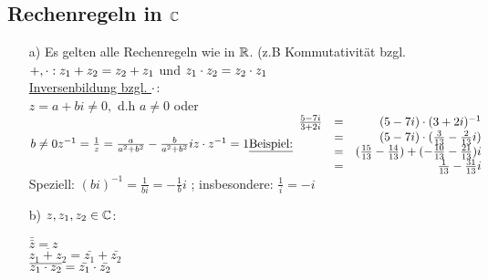 \subsection{Rechenregeln in $\mathbb{C}$}
\begin{enumerate}
\item[a)]Es gelten alle Rechenregeln wie in $\mathbb{R}$. (z.B Kommutativit\"at bzgl. $+,\cdot:z_1 + z_2 = z_2 + z_1$ und $z_1 \cdot z_2 = z_2 \cdot z_1$\\
\underline{Inversenbildung bzgl. $\cdot$}:\\
$z = a+bi \not = 0,$ d.h $a \not = 0$ oder $b \not = 0\\
z^{-1} = \frac{1}{z} = \frac{a}{a^2 + b^2} - \frac{b}{a^2+b^2}i\\
z \cdot z^{-1} = 1\\
\text{\underline{Beispiel:}}
\begin{array}{lcr}
\frac{5-7i}{3+2i} &=& (5-7i) \cdot (3+2i)^{-1}\\
&=& (5-7i) \cdot (\frac{3}{13} -\frac{2}{13}i)\\
&=& (\frac{15}{13}-\frac{14}{13}) +(-\frac{10}{13} -\frac{21}{13})i\\
&=&\frac{1}{13} - \frac{31}{13}i
\end{array}$\\
Speziell: $(bi)^{-1} = \frac{1}{bi} = -\frac{1}{b}i$ ; insbesondere: $\frac{1}{i} = -i$
\item[b)]$z,z_1,z_2 \in \mathbb{C}$:\\
\begin{center}
$\bar{\bar{z}}=z$\\
$\overline{z_1+z_2} = \bar{z_1} + \bar{z_2}$\\
$\overline{z_1\cdot z_2} = \bar{z_1} \cdot \bar{z_2}$\\
\end{center}
\end{enumerate}
